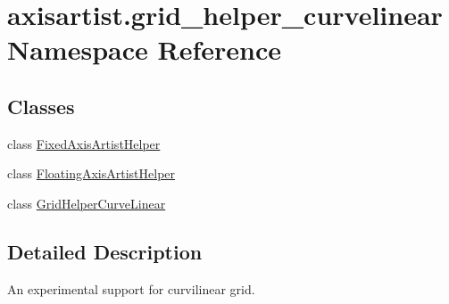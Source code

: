 \hypertarget{namespaceaxisartist_1_1grid__helper__curvelinear}{}\section{axisartist.\+grid\+\_\+helper\+\_\+curvelinear Namespace Reference}
\label{namespaceaxisartist_1_1grid__helper__curvelinear}
\subsection*{Classes}
\begin{DoxyCompactItemize}
\item 
class \hyperlink{classaxisartist_1_1grid__helper__curvelinear_1_1FixedAxisArtistHelper}{Fixed\+Axis\+Artist\+Helper}
\item 
class \hyperlink{classaxisartist_1_1grid__helper__curvelinear_1_1FloatingAxisArtistHelper}{Floating\+Axis\+Artist\+Helper}
\item 
class \hyperlink{classaxisartist_1_1grid__helper__curvelinear_1_1GridHelperCurveLinear}{Grid\+Helper\+Curve\+Linear}
\end{DoxyCompactItemize}


\subsection{Detailed Description}
\begin{DoxyVerb}An experimental support for curvilinear grid.
\end{DoxyVerb}
 